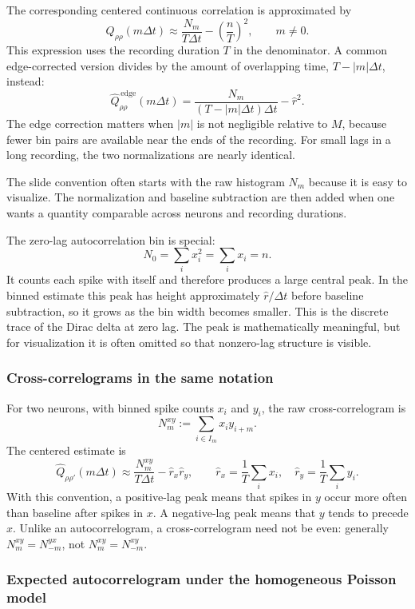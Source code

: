 \documentclass[11pt]{article}
\begin{document}
The corresponding centered continuous correlation is approximated by
\[
Q_{\rho\rho}(m\Delta t)
\approx
\frac{N_m}{T\Delta t}
-\left(\frac{n}{T}\right)^2,
\qquad m\ne 0.
\]
This expression uses the recording duration $T$ in the denominator. A common
edge-corrected version divides by the amount of overlapping time,
$T-|m|\Delta t$, instead:
\[
\widehat Q_{\rho\rho}^{\,\mathrm{edge}}(m\Delta t)
=
\frac{N_m}{(T-|m|\Delta t)\Delta t}
-\hat r^2.
\]
The edge correction matters when $|m|$ is not negligible relative to $M$,
because fewer bin pairs are available near the ends of the recording. For small
lags in a long recording, the two normalizations are nearly identical.

The slide convention often starts with the raw histogram $N_m$ because it is easy to visualize. The normalization and baseline subtraction are then added when one wants a quantity comparable across neurons and recording durations.

The zero-lag autocorrelation bin is special:
\[
N_0=\sum_i x_i^2=\sum_i x_i=n.
\]
It counts each spike with itself and therefore produces a large central peak. In
the binned estimate this peak has height approximately $\hat r/\Delta t$ before
baseline subtraction, so it grows as the bin width becomes smaller. This is the
discrete trace of the Dirac delta at zero lag. The peak is mathematically
meaningful, but for visualization it is often omitted so that nonzero-lag
structure is visible.

\subsubsection{Cross-correlograms in the same notation}

For two neurons, with binned spike counts $x_i$ and $y_i$, the raw
cross-correlogram is
\[
N^{xy}_m:=
\sum_{i\in I_m}x_i y_{i+m}.
\]
The centered estimate is
\[
\widehat Q_{\rho\rho'}(m\Delta t)
\approx
\frac{N^{xy}_m}{T\Delta t}
-\hat r_x\hat r_y,
\qquad
\hat r_x=\frac{1}{T}\sum_i x_i,\quad
\hat r_y=\frac{1}{T}\sum_i y_i.
\]
With this convention, a positive-lag peak means that spikes in $y$ occur more
often than baseline after spikes in $x$. A negative-lag peak means that $y$
tends to precede $x$. Unlike an autocorrelogram, a cross-correlogram need not be
even: generally $N^{xy}_m=N^{yx}_{-m}$, not $N^{xy}_m=N^{xy}_{-m}$.

\subsubsection{Expected autocorrelogram under the homogeneous Poisson model}
\end{document}

